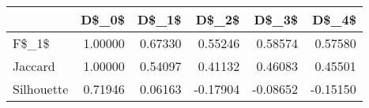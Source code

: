 \begin{table}
\centering
\caption{}
\label{}
\begin{tabular}{lrrrrr}
\toprule
{} &   D\$\_0\$ &   D\$\_1\$ &    D\$\_2\$ &    D\$\_3\$ &    D\$\_4\$ \\
\midrule
F\$\_1\$      & 1.00000 & 0.67330 &  0.55246 &  0.58574 &  0.57580 \\
Jaccard    & 1.00000 & 0.54097 &  0.41132 &  0.46083 &  0.45501 \\
Silhouette & 0.71946 & 0.06163 & -0.17904 & -0.08652 & -0.15150 \\
\bottomrule
\end{tabular}
\end{table}
